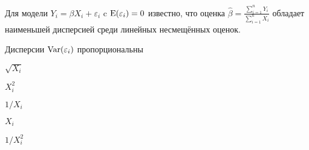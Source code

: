
\begin{question}
Для модели \(Y_i = \beta X_i + \varepsilon_i\) c
\(\operatorname{E}(\varepsilon_i) = 0\) известно, что оценка
\(\hat \beta = \frac{\sum_{i=1}^n Y_i}{\sum_{i=1}^n X_i}\) обладает
наименьшей дисперсией среди линейных несмещённых оценок.

Дисперсии \(\operatorname{Var}(\varepsilon_i)\) пропорциональны
\begin{answerlist}
  \item \(\sqrt{X_i}\)
  \item \(X_i^2\)
  \item \(1/X_i\)
  \item \(X_i\)
  \item \(1/X_i^2\)
\end{answerlist}
\end{question}



